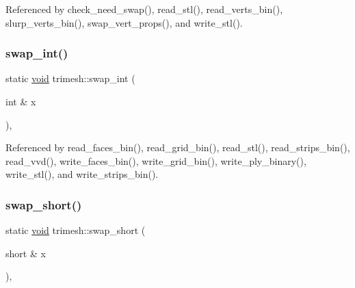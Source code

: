 Referenced by check\+\_\+need\+\_\+swap(), read\+\_\+stl(), read\+\_\+verts\+\_\+bin(), slurp\+\_\+verts\+\_\+bin(), swap\+\_\+vert\+\_\+props(), and write\+\_\+stl().

\mbox{\label{namespacetrimesh_a24751f8d6b73e77b797ae303cdfc5bee}} 
\subsubsection{\texorpdfstring{swap\+\_\+int()}{swap\_int()}}
{\footnotesize\ttfamily static \hyperlink{namespacetrimesh_a784ddfd979e1c579bda795a8edfc3f43}{void} trimesh\+::swap\+\_\+int (\begin{DoxyParamCaption}\item[{int \&}]{x }\end{DoxyParamCaption})\hspace{0.3cm}{\ttfamily [inline]}, {\ttfamily [static]}}



Referenced by read\+\_\+faces\+\_\+bin(), read\+\_\+grid\+\_\+bin(), read\+\_\+stl(), read\+\_\+strips\+\_\+bin(), read\+\_\+vvd(), write\+\_\+faces\+\_\+bin(), write\+\_\+grid\+\_\+bin(), write\+\_\+ply\+\_\+binary(), write\+\_\+stl(), and write\+\_\+strips\+\_\+bin().

\mbox{\label{namespacetrimesh_ae4885974cd480eeb0bb63a3595eef4fd}} 
\subsubsection{\texorpdfstring{swap\+\_\+short()}{swap\_short()}}
{\footnotesize\ttfamily static \hyperlink{namespacetrimesh_a784ddfd979e1c579bda795a8edfc3f43}{void} trimesh\+::swap\+\_\+short (\begin{DoxyParamCaption}\item[{short \&}]{x }\end{DoxyParamCaption})\hspace{0.3cm}{\ttfamily [inline]}, {\ttfamily [static]}}

\mbox{\label{namespacetrimesh_a679a0ddf6b404c70457c5cc43814fe65}} 
